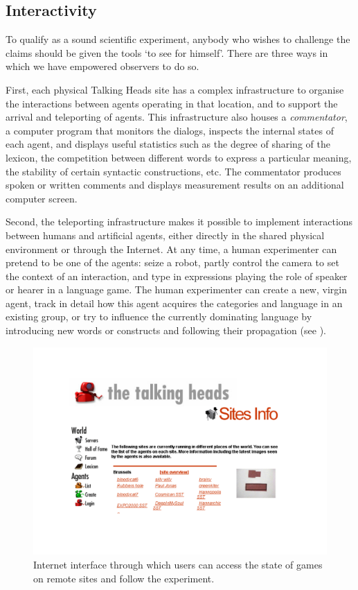 \subsection{Interactivity}

To qualify as a sound scientific experiment, anybody 
who wishes to challenge the claims should be given 
the tools `to see for himself'. There are three 
ways in which we have empowered observers to do so. 

First, each physical Talking Heads site has 
a complex infrastructure to organise the interactions between
agents operating in that location, and to support the
arrival and teleporting of agents. This infrastructure also houses
a {\it commentator}, a computer program that
monitors the dialogs, inspects the internal states of each
agent, and displays useful statistics such as the degree
of sharing of the lexicon, the competition between different
words to express a particular meaning, the stability of 
certain syntactic constructions, etc. The commentator 
produces spoken or written comments and displays
measurement results on an additional computer screen. 

Second, the teleporting infrastructure makes it possible 
to implement interactions between humans and artificial agents, 
either directly in the shared physical environment or 
through the Internet. At any time, a human experimenter can
pretend to be one of the agents: seize 
a robot, partly control the
camera to set the context of an interaction, and type 
in expressions playing the role of speaker or hearer in 
a language game. The human experimenter can create a 
new, virgin agent, track in detail how this agent acquires the 
categories and language in an existing group, 
or try to influence the currently dominating language
by introducing new words or constructs and following
their propagation (see ). 

\begin{figure}[htbp]
  \centerline{\includegraphics[width=.80\textwidth]{chap2/figs/interface}}
\caption{ Internet interface through which users can 
access the state of games on remote sites and 
follow the experiment.}
\label{f:plate8}
\end{figure}

